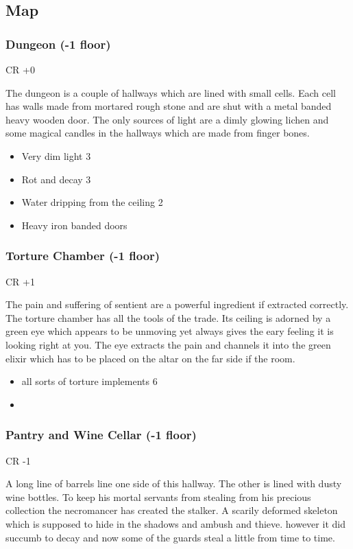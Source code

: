\documentclass[11pt]{article}
\begin{document}
{\subsection{Map}
\label{sec:org93bf30a}

\subsubsection{Dungeon (-1 floor)}
\label{sec:orgac31d9a}
CR +0

The dungeon is a couple of hallways which are lined with small cells. Each cell has walls made from mortared rough stone and are shut with a metal banded heavy wooden door. The only sources of light are a dimly glowing lichen and some magical candles in the hallways which are made from finger bones.

\begin{itemize}
\item Very dim light 3
\item Rot and decay 3
\item Water dripping from the ceiling 2
\item Heavy iron banded doors
\end{itemize}
\subsubsection{Torture Chamber (-1 floor)}
\label{sec:orga7055a6}
CR +1

The pain and suffering of sentient are a powerful ingredient if extracted correctly. The torture chamber has all the tools of the trade. Its ceiling is adorned by a green eye which appears to be unmoving yet always gives the eary feeling it is looking right at you. The eye extracts the pain and channels it into the green elixir which has to be placed on the altar on the far side if the room.

\begin{itemize}
\item all sorts of torture implements 6
\item 
\end{itemize}
\subsubsection{Pantry and Wine Cellar (-1 floor)}
\label{sec:org1c3d39f}
CR -1

A long line of barrels line one side of this hallway. The other is lined with dusty wine bottles. To keep his mortal servants from stealing from his precious collection the necromancer has created the stalker. A scarily deformed skeleton which is supposed to hide in the shadows and ambush and thieve. however it did succumb to decay and now some of the guards steal a little from time to time.

}
\end{document}
